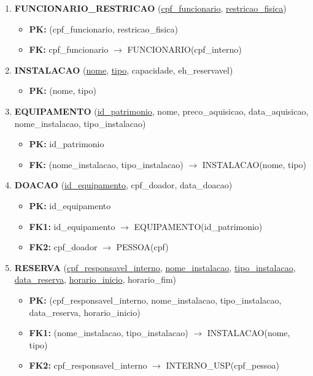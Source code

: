\documentclass{article}
\begin{document}
\begin{enumerate}
    \item \textbf{FUNCIONARIO\_RESTRICAO} (\underline{cpf\_funcionario}, \underline{restricao\_fisica})
        \begin{itemize}
            \item \textbf{PK:} (cpf\_funcionario, restricao\_fisica)
            \item \textbf{FK:} cpf\_funcionario $\rightarrow$ FUNCIONARIO(cpf\_interno)
        \end{itemize}

    \item \textbf{INSTALACAO} (\underline{nome}, \underline{tipo}, capacidade, eh\_reservavel)
        \begin{itemize}
            \item \textbf{PK:} (nome, tipo)
        \end{itemize}

    \item \textbf{EQUIPAMENTO} (\underline{id\_patrimonio}, nome, preco\_aquisicao, data\_aquisicao, nome\_instalacao, tipo\_instalacao)
        \begin{itemize}
            \item \textbf{PK:} id\_patrimonio
            \item \textbf{FK:} (nome\_instalacao, tipo\_instalacao) $\rightarrow$ INSTALACAO(nome, tipo)
        \end{itemize}
        
    \item \textbf{DOACAO} (\underline{id\_equipamento}, cpf\_doador, data\_doacao)
        \begin{itemize}
            \item \textbf{PK:} id\_equipamento
            \item \textbf{FK1:} id\_equipamento $\rightarrow$ EQUIPAMENTO(id\_patrimonio)
            \item \textbf{FK2:} cpf\_doador $\rightarrow$ PESSOA(cpf)
        \end{itemize}

    \item \textbf{RESERVA} (\underline{cpf\_responsavel\_interno}, \underline{nome\_instalacao}, \underline{tipo\_instalacao}, \underline{data\_reserva}, \underline{horario\_inicio}, horario\_fim)
         \begin{itemize}
            \item \textbf{PK:} (cpf\_responsavel\_interno, nome\_instalacao, tipo\_instalacao, data\_reserva, horario\_inicio)
            \item \textbf{FK1:} (nome\_instalacao, tipo\_instalacao) $\rightarrow$ INSTALACAO(nome, tipo)
            \item \textbf{FK2:} cpf\_responsavel\_interno $\rightarrow$ INTERNO\_USP(cpf\_pessoa)
        \end{itemize}
        

\end{enumerate}
\end{document}
